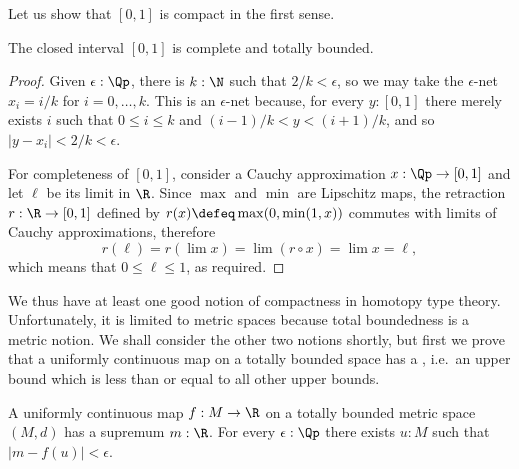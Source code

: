 Let us show that $[0,1]$ is compact in the first sense.

\begin{thm} \label{analysis-interval-ctb}
  The closed interval $[0,1]$ is complete and totally bounded.
\end{thm}

\begin{proof}
  Given $\epsilon : \Qp$, there is $k : \N$ such that $2/k < \epsilon$, so we may take the
  $\epsilon$-net $x_i = i/k$ for $i = 0, \ldots, k$. This is an $\epsilon$-net because,
  for every $y : [0,1]$ there merely exists $i$ such that $0 \leq i \leq k$ and $(i -
  1)/k < y < (i+1)/k$, and so $|y - x_i| < 2/k < \epsilon$.

  For completeness of $[0,1]$, consider a Cauchy approximation $x : \Qp \to
  [0,1]$ and let $\ell$ be its limit in $\R$. Since $\max$ and $\min$ are Lipschitz maps,
  the retraction $r : \R \to [0,1]$ defined by $r(x) \defeq \max(0, \min(1, x))$ commutes
  with limits of Cauchy approximations, therefore
  \begin{equation*}
    r(\ell) =
    r (\lim x) =
    \lim (r \circ x) =
    \lim x =
    \ell,
  \end{equation*}
  which means that $0 \leq \ell \leq 1$, as required.
\end{proof}

We thus have at least one good notion of compactness in homotopy type theory.
Unfortunately, it is limited to metric spaces because total boundedness is a metric
notion. We shall consider the other two notions shortly, but first we prove that a
uniformly continuous map on a totally bounded space has a ,
%
i.e.\ an upper bound which is less than or equal to all other upper bounds.

\begin{thm} \label{ctb-uniformly-continuous-sup}
  A uniformly continuous map $f : M \to \R$ on a totally bounded metric space
  $(M, d)$ has a supremum $m : \R$. For every $\epsilon : \Qp$ there exists $u : M$ such
  that $|m - f(u)| < \epsilon$.
\end{thm}

